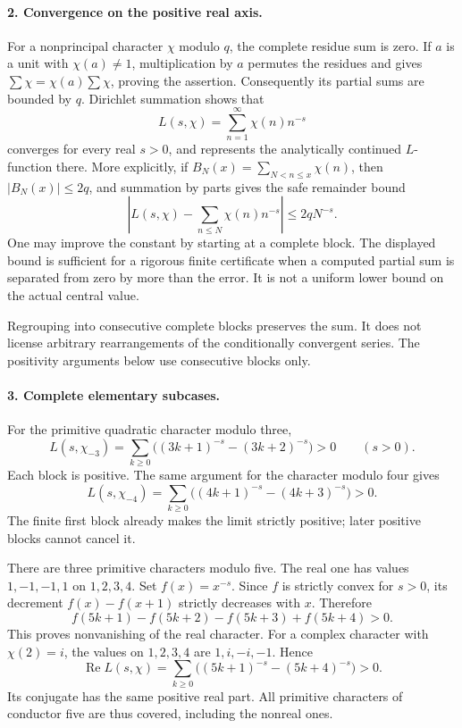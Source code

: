 \documentclass[11pt]{article}
\begin{document}
\paragraph{2. Convergence on the positive real axis.}
For a nonprincipal character $\chi$ modulo $q$, the complete residue sum is zero. If $a$ is a unit with $\chi(a)\ne1$, multiplication by $a$ permutes the residues and gives $\sum\chi=\chi(a)\sum\chi$, proving the assertion. Consequently its partial sums are bounded by $q$. Dirichlet summation shows that
\[
 L(s,\chi)=\sum_{n=1}^{\infty}\chi(n)n^{-s}
\]
converges for every real $s>0$, and represents the analytically continued $L$-function there. More explicitly, if $B_N(x)=\sum_{N<n\leq x}\chi(n)$, then $|B_N(x)|\leq2q$, and summation by parts gives the safe remainder bound
\[
 \left|L(s,\chi)-\sum_{n\leq N}\chi(n)n^{-s}\right|
 \leq2qN^{-s}.
\]
One may improve the constant by starting at a complete block. The displayed bound is sufficient for a rigorous finite certificate when a computed partial sum is separated from zero by more than the error. It is not a uniform lower bound on the actual central value.

Regrouping into consecutive complete blocks preserves the sum. It does not license arbitrary rearrangements of the conditionally convergent series. The positivity arguments below use consecutive blocks only.

\paragraph{3. Complete elementary subcases.}
For the primitive quadratic character modulo three,
\[
 L(s,\chi_{-3})=\sum_{k\geq0}\bigl((3k+1)^{-s}-(3k+2)^{-s}\bigr)>0
 \qquad(s>0).
\]
Each block is positive. The same argument for the character modulo four gives
\[
 L(s,\chi_{-4})=\sum_{k\geq0}\bigl((4k+1)^{-s}-(4k+3)^{-s}\bigr)>0.
\]
The finite first block already makes the limit strictly positive; later positive blocks cannot cancel it.

There are three primitive characters modulo five. The real one has values $1,-1,-1,1$ on $1,2,3,4$. Set $f(x)=x^{-s}$. Since $f$ is strictly convex for $s>0$, its decrement $f(x)-f(x+1)$ strictly decreases with $x$. Therefore
\[
 f(5k+1)-f(5k+2)-f(5k+3)+f(5k+4)>0.
\]
This proves nonvanishing of the real character. For a complex character with $\chi(2)=i$, the values on $1,2,3,4$ are $1,i,-i,-1$. Hence
\[
 \operatorname{Re} L(s,\chi)
 =\sum_{k\geq0}\bigl((5k+1)^{-s}-(5k+4)^{-s}\bigr)>0.
\]
Its conjugate has the same positive real part. All primitive characters of conductor five are thus covered, including the nonreal ones.
\end{document}
